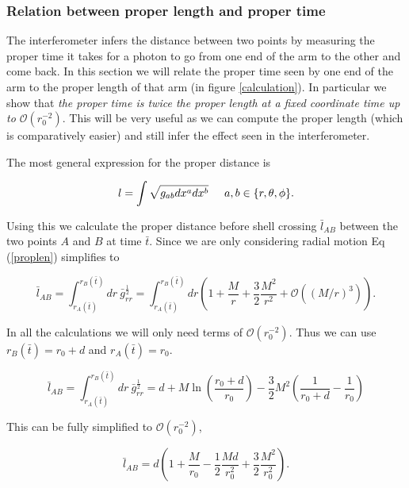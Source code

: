 \documentclass[aps,showpacs,onecolumn,floats,prd,superscriptaddress,nofootinbib]{revtex4-1}
\begin{document}
\subsubsection{Relation between proper length and proper time}

The interferometer infers the distance between two points by measuring the proper time it takes for a photon to go from one end of the arm to the other and come back. In this section we will relate the proper time seen by one end of the arm to the proper length of that arm (in figure \ref{calculation}). 
In particular we show that \emph{the proper time is twice the proper length at a fixed coordinate time up to $\mathcal{O}(r_0^{-2})$}. This will be very useful as we can compute the proper length (which is comparatively easier) and still infer the effect seen in the interferometer.

 The most general expression for the proper distance is 

\begin{equation}
	l = \int \sqrt{g_{ab} dx^a dx^b} \hspace{5mm} a,b \in \{r,\theta,\phi\}.	\label{proplen}
\end{equation}

Using this we calculate the proper distance before shell crossing $\bar{l}_{AB}$ between the two points $A$ and $B$ at time $\bar{t}$. Since we are only considering radial motion Eq (\ref{proplen}) simplifies to

\begin{equation}
	\bar{l}_{AB} = \int^{r_B(\bar{t})}_{r_A(\bar{t})} dr \ \bar{g}_{rr}^\frac{1}{2}  = \int^{r_B(\bar{t})}_{r_A(\bar{t})} dr \left( 1 + \frac{M}{r} + \frac{3}{2} \frac{M^2}{r^2}  + \mathcal{O}((M/r)^3) \right).
\end{equation}

In all the calculations we will only need terms of $\mathcal{O}(r_0^{-2})$. Thus we can use $r_B(\bar{t}) = r_0 + d$ and $r_A(\bar{t})  = r_0$. 

\begin{equation}
	 \bar{l}_{AB} =  \int^{r_B(\bar{t})}_{r_A(\bar{t})}  dr \ \bar{g}_{rr}^\frac{1}{2}  = d + M \ln \left( \frac{r_0 + d}{r_0} \right) - \frac{3}{2} M^2 \left( \frac{1}{r_0 + d} - \frac{1}{r_0} \right)
\end{equation}

This can be fully simplified to $\mathcal{O}(r_0^{-2})$,

\begin{equation}
	 \bar{l}_{AB} =  d \left( 1 + \frac{M}{r_0} - \frac{1}{2} \frac{Md}{r_0^2} + \frac{3}{2} \frac{M^2}{r_0^2} \right).
\end{equation}
\end{document}
